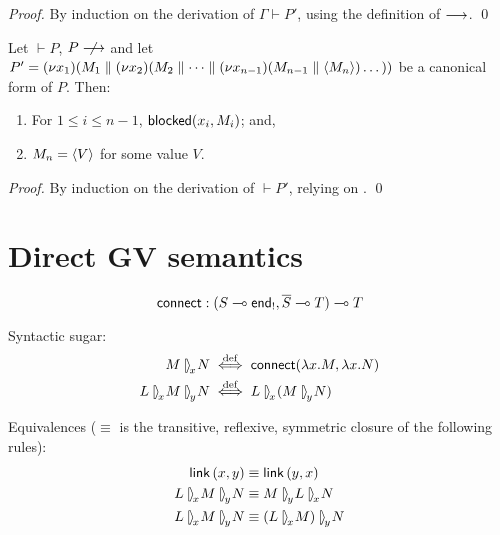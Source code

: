 \documentclass[orivec,envcountsame]{llncs}
\begin{document}
\begin{proof}
  By induction on the derivation of $\Gamma \vdash P'$, using the definition of $\longrightarrow$. \qed
\end{proof}

\begin{corollary}\label{thm:progress}
  Let $\vdash P$, $P \centernot\ceval$ and let $P' = (\nu x_1)(M_1 \parallel (\nu
  x_2)(M_2 \parallel \dots \parallel (\nu x_{n-1})(M_{n-1} \parallel \langle M_n \rangle)\dots))$ be
  a canonical form of $P$.  Then:
  \begin{enumerate}
  \item For $1 \leq i \leq n - 1$, $\mathsf{blocked}(x_i,M_i)$; and,
  \item $M_n = \langle V \rangle$ for some value $V$.
  \end{enumerate}
\end{corollary}

\begin{proof}
  By induction on the derivation of $\vdash P'$, relying on .  \qed
\end{proof}

\section{Direct GV semantics}

\newcommand{\rpar}[1]{\mathbin{{[}\:\!\!\rangle}_{\!{#1}}\!}
\newcommand{\lrpar}[1]{\mathbin{\langle\hspace{-.3ex}\rangle}_{\!{#1}}\!}
\newcommand{\lpar}[1]{\mathbin{\langle\:\!\!{]}}_{{#1}}\!}

\newcommand{\con}[3]{{#1} \rpar{#2} {#3}}

\[
\mathsf{connect} : (S \multimap \mathsf{end}_!, \overline{S} \multimap T) \multimap T
\]

Syntactic sugar:
\begin{align*}
\con{M}{x}{N} &\defiff \mkwd{connect}(\lambda x.M, \lambda x.N) \\
\con{L}{x}{\con{M}{y}{N}} &\defiff \con{L}{x}{(\con{M}{y}{N})} \\
\end{align*}

Equivalences ($\equiv$ is the transitive, reflexive, symmetric closure of the following rules):
\begin{align*}
\mkwd{link}\,(x,y) &\equiv \mkwd{link}\,(y,x) \\
\con{L}{x}{\con{M}{y}{N}} &\equiv \con{M}{y}{\con{L}{x}{N}} \\
\con{L}{x}{\con{M}{y}{N}} &\equiv \con{(\con{L}{x}{M})}{y}{N} \\
\end{align*}
\end{document}
